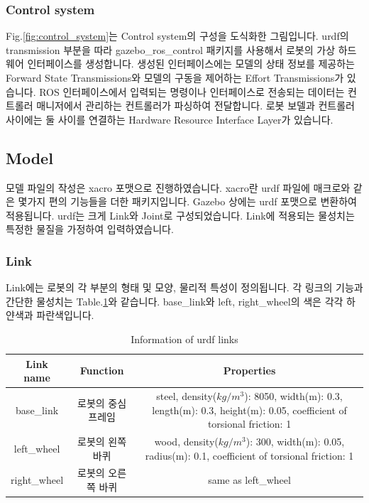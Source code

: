 \documentclass{article}
\begin{document}
			\subsubsection{Control system}
			Fig.\ref{fig:control_system}는 Control system의 구성을 도식화한 그림입니다. urdf의 transmission 부분을 따라 gazebo\_ros\_control 패키지를 사용해서 로봇의 가상 하드웨어 인터페이스를 생성합니다. 생성된 인터페이스에는 모델의 상태 정보를 제공하는 Forward State Transmissions와 모델의 구동을 제어하는 Effort Transmissions가 있습니다. ROS 인터페이스에서 입력되는 명령이나 인터페이스로 전송되는 데이터는 컨트롤러 매니저에서 관리하는 컨트롤러가 파싱하여 전달합니다. 로봇 보델과 컨트롤러 사이에는 둘 사이를 연결하는 Hardware Resource Interface Layer가 있습니다.

		\subsection{Model}
		모델 파일의 작성은 xacro 포맷으로 진행하였습니다. xacro란 urdf 파일에 매크로와 같은 몇가지 편의 기능들을 더한 패키지입니다. Gazebo 상에는 urdf 포맷으로 변환하여 적용됩니다. urdf는 크게 Link와 Joint로 구성되었습니다. Link에 적용되는 물성치는 특정한 물질을 가정하여 입력하였습니다.
		
			\subsubsection{Link}
			 Link에는 로봇의 각 부분의 형태 및 모양, 물리적 특성이 정의됩니다. 각 링크의 기능과 간단한 물성치는 Table.\ref{table:urdf_link}와 같습니다. base\_link와 left, right\_wheel의 색은 각각 하얀색과 파란색입니다.
			 		
			\begin{table}[h]
			\centering
			\caption{Information of urdf links}
			\begin{tabular}{c|c|c}
				\textbf{Link name} & \textbf{Function} & \textbf{Properties} \\
				\hline
				base\_link & 로봇의 중심 프레임 & \makecell{steel, density($kg/m^{3}$): 8050, \\ width(m): 0.3, length(m): 0.3, \\ height(m): 0.05,\\ coefficient of torsional friction: 1}\\
				\hline
				left\_wheel & 로봇의 왼쪽 바퀴 & \makecell{wood, density($kg/m^{3}$): 300, \\ width(m): 0.05, radius(m): 0.1, \\ coefficient of torsional friction: 1}\\
				\hline
				right\_wheel & 로봇의 오른쪽 바퀴 & same as left\_wheel\\
			\end{tabular}
			\label{table:urdf_link}
			\end{table}
			
\end{document}
